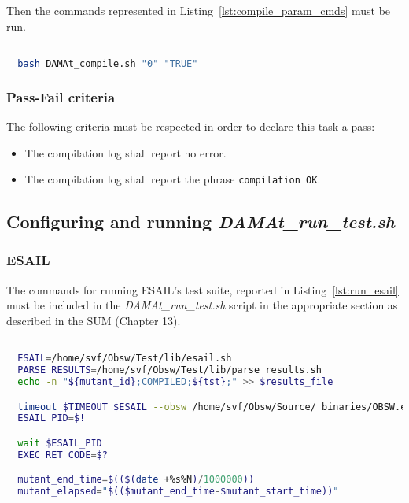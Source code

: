 Then the commands represented in Listing~\ref{lst:compile_param_cmds} must be run.

  \begin{lstlisting}[language=bash, label={lst:compile_param_cmds}]

  bash DAMAt_compile.sh "0" "TRUE"

  \end{lstlisting}

\subsubsection{Pass-Fail criteria}

The following criteria must be respected in order to declare this task a pass:
\begin{itemize}
  \item The compilation log shall report no error.
  \item The compilation log shall report the phrase \texttt{compilation OK}.
\end{itemize}


\subsection{Configuring and running \emph{DAMAt\_run\_test.sh}}

\subsubsection{ESAIL}

The commands for running ESAIL's test suite, reported in Listing~\ref{lst:run_esail} must be included in the \emph{DAMAt\_run\_test.sh} script in the appropriate section as described in the SUM (Chapter 13).


  \begin{lstlisting}[language=bash, label={lst:run_esail}]

  ESAIL=/home/svf/Obsw/Test/lib/esail.sh
  PARSE_RESULTS=/home/svf/Obsw/Test/lib/parse_results.sh
  echo -n "${mutant_id};COMPILED;${tst};" >> $results_file

  timeout $TIMEOUT $ESAIL --obsw /home/svf/Obsw/Source/_binaries/OBSW.exe --fast -n -c --source /home/svf/Obsw/Source --version 04010000 -t $tst &
  ESAIL_PID=$!

  wait $ESAIL_PID
  EXEC_RET_CODE=$?

  mutant_end_time=$(($(date +%s%N)/1000000))
  mutant_elapsed="$(($mutant_end_time-$mutant_start_time))"

  \end{lstlisting}

